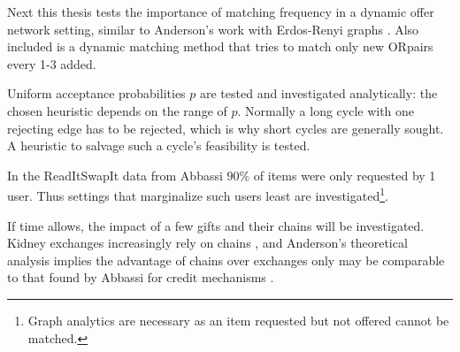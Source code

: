 \documentclass[main.tex]{subfiles}
\begin{document}
Next this thesis tests the importance of matching frequency in a dynamic offer network setting, similar to Anderson's work with Erdos-Renyi graphs \cite{And1}. Also included is a dynamic matching method that tries to match only new ORpairs every 1-3 added.

Uniform acceptance probabilities $p$ are tested and investigated analytically: the chosen heuristic depends on the range of $p$. Normally a long cycle with one rejecting edge has to be rejected, which is why short cycles are generally sought. A heuristic to salvage such a cycle's feasibility is tested.

In the ReadItSwapIt data from Abbassi \cite{Abb2} $90\%$ of items were only requested by 1 user. Thus settings that marginalize such users least are investigated\footnote{Graph analytics are necessary as an item requested but not offered cannot be matched.}.

If time allows, the impact of a few gifts and their chains will be investigated. Kidney exchanges increasingly rely on chains \cite{Dick}, and Anderson's theoretical analysis \cite{And1} implies the advantage of chains over exchanges only may be comparable to that found by Abbassi for credit mechanisms \cite{Abb2}.
\end{document}
